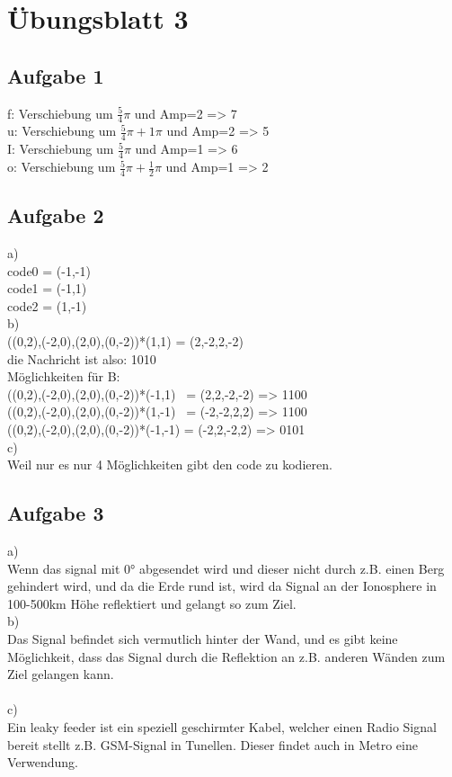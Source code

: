 \documentclass[12pt,a4paper,headsepline]{scrreprt}
\begin{document}


\section*{Übungsblatt 3}

\subsection*{Aufgabe 1}

f: Verschiebung um $\frac{5}{4}\pi$ und Amp=2 => 7\\
u: Verschiebung um $\frac{5}{4}\pi + 1\pi$ und Amp=2 => 5\\
I: Verschiebung um $\frac{5}{4}\pi$ und Amp=1 => 6\\
o: Verschiebung um $\frac{5}{4}\pi + \frac{1}{2}\pi$ und Amp=1 => 2

\subsection*{Aufgabe 2}
a)\\
code0 = (-1,-1)\\
code1 = (-1,1)\\
code2 = (1,-1)\\

b)\\
((0,2),(-2,0),(2,0),(0,-2))*(1,1) = (2,-2,2,-2)
\\
die Nachricht ist also: 1010\\

Möglichkeiten für B:\\
((0,2),(-2,0),(2,0),(0,-2))*(-1,1) \ = (2,2,-2,-2) => 1100\\
((0,2),(-2,0),(2,0),(0,-2))*(1,-1) \ = (-2,-2,2,2) => 1100\\
((0,2),(-2,0),(2,0),(0,-2))*(-1,-1) = (-2,2,-2,2) => 0101\\

c)\\
Weil nur es nur 4 Möglichkeiten gibt den code zu kodieren.

\subsection*{Aufgabe 3}
a)\\
Wenn das signal mit 0° abgesendet wird und dieser nicht durch z.B. einen Berg gehindert wird, und da die Erde rund ist, wird da Signal an der Ionosphere in 100-500km Höhe reflektiert und gelangt so zum Ziel.\\

b)\\
Das Signal befindet sich vermutlich hinter der Wand, und es gibt keine Möglichkeit, dass das Signal durch die Reflektion an z.B. anderen Wänden zum Ziel gelangen kann.\\
\\

c)\\
Ein leaky feeder ist ein speziell geschirmter Kabel, welcher einen Radio Signal bereit stellt z.B. GSM-Signal in Tunellen. Dieser findet auch in Metro eine Verwendung.
\end{document}
